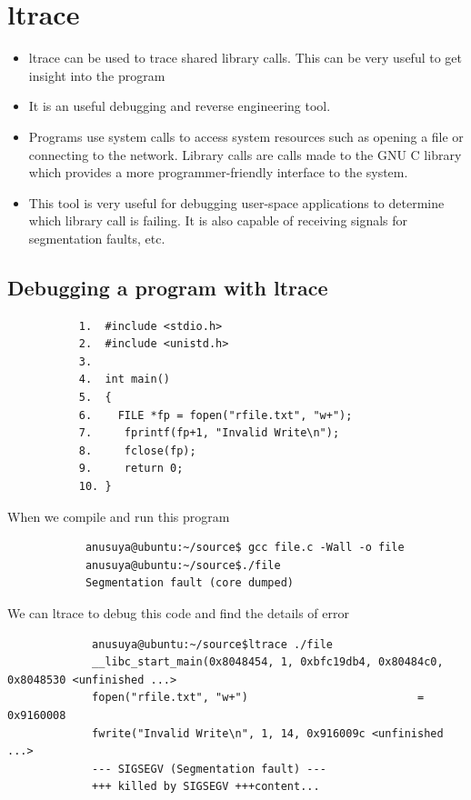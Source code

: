 \documentclass[12pt]{report}
\begin{document}
\section{ltrace}
\begin{itemize}
	\item ltrace can be used to trace shared library calls. This can be very useful to get
	insight into the program 
    \item It is an useful debugging and reverse engineering tool.
    \item Programs use system calls to access system resources such as opening a file or connecting to the network. Library calls are calls made to the GNU C library which provides a more programmer-friendly interface to the system.
    \item This tool is very useful for debugging user-space applications to determine which library call is failing. It is also capable of receiving signals for segmentation faults, etc.
    
\end{itemize}
\subsection{Debugging a program with ltrace}	
	
	\begin{lstlisting}
           1.  #include <stdio.h>
           2.  #include <unistd.h>
           3.            
           4.  int main()
           5.  {
           6.    FILE *fp = fopen("rfile.txt", "w+");
           7.     fprintf(fp+1, "Invalid Write\n");
           8.     fclose(fp);
           9.     return 0;
           10. }
	\end{lstlisting}
	
	When we compile and run this program 
	\begin{lstlisting}
	        anusuya@ubuntu:~/source$ gcc file.c -Wall -o file
	        anusuya@ubuntu:~/source$./file
	        Segmentation fault (core dumped)
	\end{lstlisting}
	
	We can ltrace to debug this code and find the details of error
	
	\begin{lstlisting}
	         anusuya@ubuntu:~/source$ltrace ./file
	         __libc_start_main(0x8048454, 1, 0xbfc19db4, 0x80484c0, 0x8048530 <unfinished ...>
	         fopen("rfile.txt", "w+")                          = 0x9160008
	         fwrite("Invalid Write\n", 1, 14, 0x916009c <unfinished ...>
	         --- SIGSEGV (Segmentation fault) ---
	         +++ killed by SIGSEGV +++content...
	\end{lstlisting}
	
\end{document}
